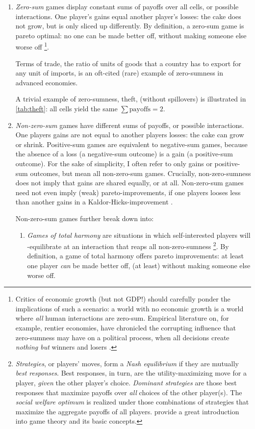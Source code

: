 \begin{enumerate}
	\item
		\emph{Zero-sum} games display constant sums of payoffs over all cells, or possible interactions.
		One player's gains equal another player's losses: the cake does not grow, but is only sliced up differently.
		By definition, a zero-sum game is pareto optimal: no one can be made better off, without making someone else worse off
		\footnote{
			Critics of economic growth (but not \gls{GDP}!) should carefully ponder the implications of such a scenario: a world with no economic growth is a world where \emph{all} human interactions are zero-sum.
			Empirical literature on, for example, rentier economies, have chronicled the corrupting influence that zero-sumness may have on a political process, when all decisions create \emph{nothing but} winners and losers \citep{Beblawi1990}.
		}.

		Terms of trade, the ratio of units of goods that a country has to export for any unit of imports, is an oft-cited (rare) example of zero-sumness in advanced economies.%

		A trivial example of zero-sumness, theft, (without spillovers) is illustrated in \autoref{tab:theft}: all cells yield the same $\sum{\text{payoffs}}=2$.

	\item
		\emph{Non-zero-sum} games have different sums of payoffs, or possible interactions.
		One players gains are not equal to another players losses: the cake can grow or shrink. Positive-sum games are equivalent to negative-sum games, because the absence of a loss (a negative-sum outcome) is a gain (a positive-sum outcome).
		For the sake of simplicity, I often refer to only gains or positive-sum outcomes, but mean all non-zero-sum games.
		Crucially, non-zero-sumness does not imply that gains are shared equally, or at all. Non-zero-sum games need not even imply (weak) pareto-improvements, if one players looses less than another gains in a Kaldor-Hicks-improvement \citep{Kaldor1939,Hicks1939}.

	Non-zero-sum games further break down into:
	\begin{enumerate}
		\item
			\emph{Games of total harmony} are situations in which self-interested players will \citeauthor{Nash1951}-equilibrate at an interaction that reaps all non-zero-sumness
			\footnote{
				\emph{Strategies}, or players' moves, form a \emph{Nash equilibrium} if they are mutually \emph{best responses}.
				Best responses, in turn, are the utility-maximizing move for a player, \emph{given} the other player's choice. \emph{Dominant strategies} are those best responses that maximize payoffs over \emph{all} choices of the other player(s).
				The \emph{social welfare optimum} is realized under those combinations of strategies that maximize the aggregate payoffs of all players.
				\cite{Kleinberg-2009-oz} provide a great introduction into game theory and its basic concepts.
			}.
			By definition, a game of total harmony offers pareto improvements: at least one player \emph{can} be made better off, (at least) without making someone else worse off.


\end{enumerate}
\end{enumerate}
